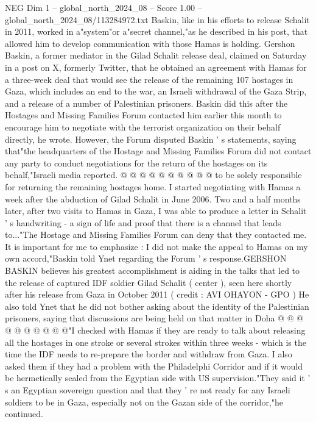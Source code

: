 \begin{textsample}{NEG Dim 1 – global\_north\_2024\_08 – Score 1.00 – global\_north\_2024\_08/113284972.txt}  \label{ex:f1_neg_378}
Baskin, like in his efforts to release Schalit in 2011, worked in a"system"or a"secret channel,"as he described in his post, that allowed him to develop communication with those Hamas is holding.
Gershon Baskin, a former mediator in the Gilad Schalit release deal, claimed on Saturday in a post on X, formerly Twitter, that he obtained an agreement with Hamas for a three-week deal that would see the release of the remaining 107 hostages in Gaza, which includes an end to the war, an Israeli withdrawal of the Gaza Strip, and a release of a number of Palestinian prisoners.
Baskin did this after the Hostages and Missing Families Forum contacted him earlier this month to encourage him to negotiate with the terrorist organization on their behalf directly, he wrote.
However, the Forum disputed Baskin ' s statements, saying that"the headquarters of the Hostage and Missing Families Forum did not contact any party to conduct negotiations for the return of the hostages on its behalf,"Israeli media reported. @ @ @ @ @ @ @ @ @ @ to be solely responsible for returning the remaining hostages home.
I started negotiating with Hamas a week after the abduction of Gilad Schalit in June 2006.
Two and a half months later, after two visits to Hamas in Gaza, I was able to produce a letter in Schalit ' s handwriting - a sign of life and proof that there is a channel that leads to..."The Hostage and Missing Families Forum can deny that they contacted me.
It is important for me to emphasize : I did not make the appeal to Hamas on my own accord,"Baskin told Ynet regarding the Forum ' s response.GERSHON BASKIN believes his greatest accomplishment is aiding in the talks that led to the release of captured IDF soldier Gilad Schalit ( center ), seen here shortly after his release from Gaza in October 2011 ( credit : AVI OHAYON - GPO ) He also told Ynet that he did not bother asking about the identity of the Palestinian prisoners, saying that discussions are being held on that matter in Doha @ @ @ @ @ @ @ @ @ @"I checked with Hamas if they are ready to talk about releasing all the hostages in one stroke or several strokes within three weeks - which is the time the IDF needs to re-prepare the border and withdraw from Gaza.
I also asked them if they had a problem with the Philadelphi Corridor and if it would be hermetically sealed from the Egyptian side with US supervision."They said it ' s an Egyptian sovereign question and that they ' re not ready for any Israeli soldiers to be in Gaza, especially not on the Gazan side of the corridor,"he continued.

\end{textsample}
